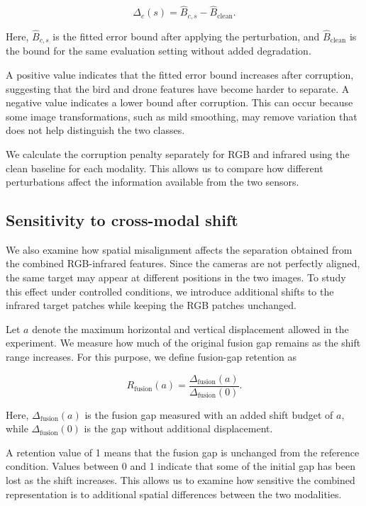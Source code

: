 \documentclass[10pt]{article}
\newcommand{\Bhat}{\widehat B}
\newcommand{\bfg}{\Delta_{\mathrm{fusion}}}
\begin{document}
\begin{equation}
\Delta_c(s)
=
\Bhat_{c,s}
-
\Bhat_{\mathrm{clean}}.
\label{eq:corruptpenalty}
\end{equation}

Here, $\Bhat_{c,s}$ is the fitted error bound after applying the perturbation, and $\Bhat_{\mathrm{clean}}$ is the bound for the same evaluation setting without added degradation.

A positive value indicates that the fitted error bound increases after corruption, suggesting that the bird and drone features have become harder to separate. A negative value indicates a lower bound after corruption. This can occur because some image transformations, such as mild smoothing, may remove variation that does not help distinguish the two classes.

We calculate the corruption penalty separately for RGB and infrared using the clean baseline for each modality. This allows us to compare how different perturbations affect the information available from the two sensors.

\subsection{Sensitivity to cross-modal shift}

We also examine how spatial misalignment affects the separation obtained from the combined RGB-infrared features. Since the cameras are not perfectly aligned, the same target may appear at different positions in the two images. To study this effect under controlled conditions, we introduce additional shifts to the infrared target patches while keeping the RGB patches unchanged.

Let $a$ denote the maximum horizontal and vertical displacement allowed in the experiment. We measure how much of the original fusion gap remains as the shift range increases. For this purpose, we define fusion-gap retention as

\begin{equation}
R_{\mathrm{fusion}}(a)
=
\frac{\bfg(a)}
{\bfg(0)}.
\label{eq:retention}
\end{equation}

Here, $\bfg(a)$ is the fusion gap measured with an added shift budget of $a$, while $\bfg(0)$ is the gap without additional displacement.

A retention value of 1 means that the fusion gap is unchanged from the reference condition. Values between 0 and 1 indicate that some of the initial gap has been lost as the shift increases. This allows us to examine how sensitive the combined representation is to additional spatial differences between the two modalities.
\end{document}
